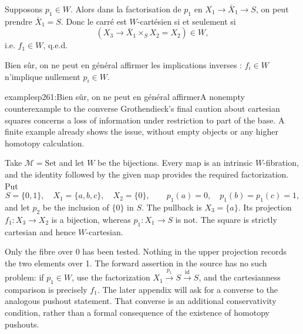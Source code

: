 Supposons $p_1\in W$. Alors dans la factorisation de $p_1$ en $X_1\longrightarrow\bar{X}_1\longrightarrow S$, on peut prendre $\bar{X}_1=S$. Donc le carré est $W$-cartésien si et seulement si
\[
(X_3\longrightarrow\bar{X}_1\times_S X_2=X_2)\in W,
\]
i.e. $f_1\in W$, q.e.d.

Bien sûr, on ne peut en général affirmer les implications inverses : $f_i\in W$ n'implique nullement $p_i\in W$.

\begin{dcomment}{examples}{p261:Bien sûr, on ne peut en général affirmer}{A nonempty counterexample to the converse}
Grothendieck's final caution about cartesian squares concerns a loss of information under restriction to part of the base. A finite example already shows the issue, without empty objects or any higher homotopy calculation.

Take $\mathcal M=\mathrm{Set}$ and let $W$ be the bijections. Every map is an intrinsic $W$-fibration, and the identity followed by the given map provides the required factorization. Put
\[
 S=\{0,1\},\quad X_1=\{a,b,c\},\quad X_2=\{0\},
 \qquad p_1(a)=0,\quad p_1(b)=p_1(c)=1,
\]
and let $p_2$ be the inclusion of $\{0\}$ in $S$. The pullback is $X_3=\{a\}$. Its projection $f_1:X_3\to X_2$ is a bijection, whereas $p_1:X_1\to S$ is not. The square is strictly cartesian and hence $W$-cartesian.

Only the fibre over 0 has been tested. Nothing in the upper projection records the two elements over 1. The forward assertion in the source has no such problem: if $p_1\in W$, use the factorization $X_1\xrightarrow{p_1}S\xrightarrow{\mathrm{id}}S$, and the cartesianness comparison is precisely $f_1$. The later appendix will ask for a converse to the analogous pushout statement. That converse is an additional conservativity condition, rather than a formal consequence of the existence of homotopy pushouts.
\end{dcomment}



